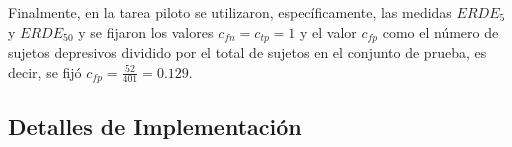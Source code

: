 

Finalmente, en la tarea piloto se utilizaron, específicamente, las medidas $ERDE_5$ y $ERDE_{50}$ y se fijaron los valores $c_{fn} = c_{tp} = 1$ y el valor $c_{fp}$ como el número de sujetos depresivos dividido por el total de sujetos en el conjunto de prueba, es decir, se fijó $c_{fp}= \frac{52}{401} = 0.129$.





\subsection{Detalles de Implementación}
\label{sec:implementation}

